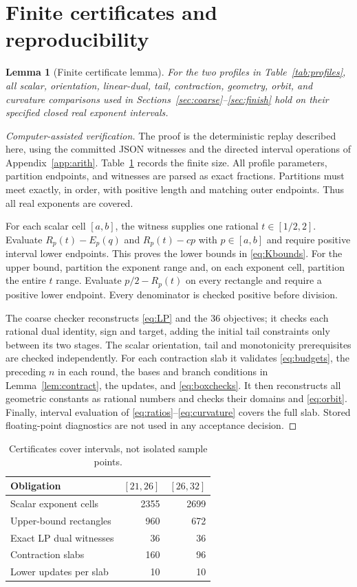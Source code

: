 \documentclass[11pt,a4paper]{article}
\newtheorem{lemma}[theorem]{Lemma}
\theoremstyle{remark}\newtheorem{remark}[theorem]{Remark}
\begin{document}
\section{Finite certificates and reproducibility}\label{sec:cert}
\begin{lemma}[Finite certificate lemma]\label{lem:finite}
For the two profiles in Table~\ref{tab:profiles}, all scalar, orientation,
linear-dual, tail, contraction, geometry, orbit, and curvature comparisons
used in Sections~\ref{sec:coarse}--\ref{sec:finish} hold on their specified
closed real exponent intervals.
\end{lemma}
\begin{proof}[Computer-assisted verification]
The proof is the deterministic replay described here, using the committed
JSON witnesses and the directed interval operations of Appendix~\ref{app:arith}.
Table~\ref{tab:counts} records the finite size. All profile parameters,
partition endpoints, and witnesses are parsed as exact fractions.
Partitions must meet exactly, in order, with positive length and matching
outer endpoints. Thus all real exponents are covered.

For each scalar cell $[a,b]$, the witness supplies one rational
$t\in[1/2,2]$. Evaluate $R_p(t)-E_p(q)$ and $R_p(t)-cp$ with
$p\in[a,b]$ and require positive interval lower endpoints. This proves
the lower bounds in \eqref{eq:Kbounds}. For the upper bound, partition
the exponent range and, on each exponent cell, partition the entire
$t$ range. Evaluate $p/2-R_p(t)$ on every rectangle and require a positive
lower endpoint. Every denominator is checked positive before division.

The coarse checker reconstructs \eqref{eq:LP} and the 36 objectives;
it checks each rational dual identity, sign and target, adding the initial
tail constraints only between its two stages. The scalar orientation,
tail and monotonicity prerequisites are checked independently.
For each contraction slab it validates \eqref{eq:budgets}, the preceding
$n$ in each round, the bases and branch conditions in
Lemma~\ref{lem:contract}, the updates, and \eqref{eq:boxchecks}.
It then reconstructs all geometric constants as rational numbers and
checks their domains and \eqref{eq:orbit}. Finally, interval evaluation
of \eqref{eq:ratios}--\eqref{eq:curvature} covers the full slab.
Stored floating-point diagnostics are not used in any acceptance decision.
\end{proof}

\begin{table}[ht]
\centering
\begin{tabular}{lrr}\toprule
Obligation & $[21,26]$ & $[26,32]$\\\midrule
Scalar exponent cells &2355&2699\\
Upper-bound rectangles &960&672\\
Exact LP dual witnesses &36&36\\
Contraction slabs &160&96\\
Lower updates per slab &10&10\\\bottomrule
\end{tabular}
\caption{Certificates cover intervals, not isolated sample points.}\label{tab:counts}
\end{table}
\end{document}
